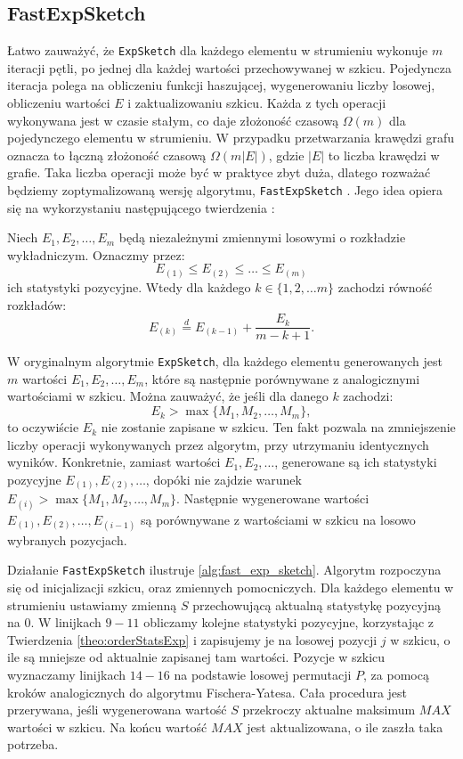 \subsection{FastExpSketch}
    Łatwo zauważyć, że \texttt{ExpSketch} dla każdego elementu w strumieniu wykonuje $m$ iteracji pętli, po jednej dla każdej wartości przechowywanej w szkicu. Pojedyncza iteracja polega na obliczeniu funkcji haszującej, wygenerowaniu liczby losowej, obliczeniu wartości $E$ i zaktualizowaniu szkicu. Każda z tych operacji wykonywana jest w czasie stałym, co daje złożoność czasową $\Omega(m)$ dla pojedynczego elementu w strumieniu. W przypadku przetwarzania krawędzi grafu oznacza to łączną złożoność czasową $\Omega(m|E|)$, gdzie $|E|$ to liczba krawędzi w grafie. Taka liczba operacji może być w praktyce zbyt duża, dlatego rozważać będziemy zoptymalizowaną wersję algorytmu, \texttt{FastExpSketch} \cite{Lemiesz_2023}. Jego idea opiera się na wykorzystaniu następującego twierdzenia \cite{Devroye_1986a}:
    \begin{twierdzenie}
        \label{theo:orderStatsExp}        
        Niech $E_1, E_2, \dots, E_m$ będą niezależnymi zmiennymi losowymi o rozkładzie wykładniczym. Oznaczmy przez:
        \[
            E_{(1)} \leq E_{(2)} \leq \dots \leq E_{(m)}  
        \]
        ich statystyki pozycyjne. Wtedy dla każdego $k \in \{1,2, \dots m\}$ zachodzi równość rozkładów: 
        \[
            E_{(k)} \stackrel{d}{=} E_{(k - 1)} + \frac{E_k}{m - k + 1}.       
        \]
    \end{twierdzenie}

    W oryginalnym algorytmie \texttt{ExpSketch}, dla każdego elementu generowanych jest $m$ wartości $E_{1}, E_{2}, \dots, E_{m}$, które są następnie porównywane z analogicznymi wartościami w szkicu. Można zauważyć, że jeśli dla danego $k$ zachodzi:
    \[
        E_{k} > \max{\{M_1, M_2, \dots, M_m\}},     
    \]
    to oczywiście $E_{k}$ nie zostanie zapisane w szkicu. Ten fakt pozwala na zmniejszenie liczby operacji wykonywanych przez algorytm, przy utrzymaniu identycznych wyników. Konkretnie, zamiast wartości $E_{1}, E_{2}, \dots$, generowane są ich statystyki pozycyjne $E_{(1)}, E_{(2)}, \dots$, dopóki nie zajdzie warunek $E_{(i)} > \max{\{M_1, M_2, \dots, M_m\}}$. Następnie wygenerowane wartości $E_{(1)}, E_{(2)}, \dots, E_{(i - 1)}$ są porównywane z wartościami w szkicu na losowo wybranych pozycjach. 
    
    Działanie \texttt{FastExpSketch} ilustruje  \ref{alg:fast_exp_sketch}. Algorytm rozpoczyna się od inicjalizacji szkicu, oraz zmiennych pomocniczych. Dla każdego elementu w strumieniu ustawiamy zmienną $S$ przechowującą aktualną statystykę pozycyjną na $0$. W linijkach $9-11$ obliczamy kolejne statystyki pozycyjne, korzystając z Twierdzenia \ref{theo:orderStatsExp} i zapisujemy je na losowej pozycji $j$ w szkicu, o ile są mniejsze od aktualnie zapisanej tam wartości. Pozycje w  szkicu wyznaczamy linijkach $14-16$ na podstawie losowej permutacji $P$, za pomocą kroków analogicznych do algorytmu Fischera-Yatesa. Cała procedura jest przerywana, jeśli wygenerowana wartość $S$ przekroczy aktualne maksimum $MAX$ wartości w szkicu. Na końcu wartość $MAX$ jest aktualizowana, o ile zaszła taka potrzeba.

